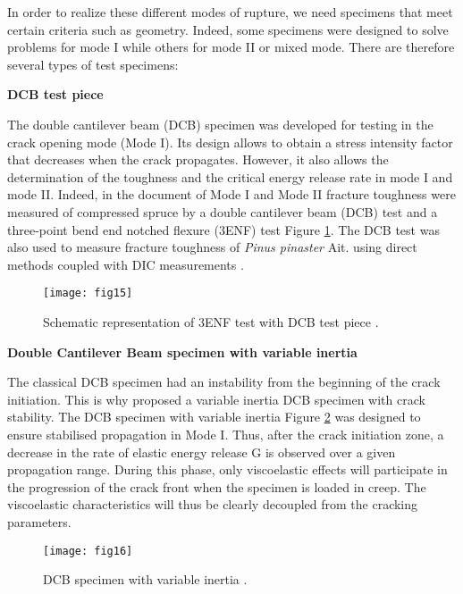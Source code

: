 In order to realize these different modes of rupture, we need specimens that meet certain criteria such as geometry. Indeed, some specimens were designed to solve problems for mode I while others for mode II or mixed mode. There are therefore several types of test specimens:

\textbf{DCB test piece}

The double cantilever beam (DCB) specimen was developed for testing in the crack opening mode (Mode I). Its design allows to obtain a stress intensity factor that decreases when the crack propagates. However, it also allows the determination of the toughness and the critical energy release rate in mode I and mode II. Indeed, in the document of \citep{YoshiharaandNobusue2008} Mode I and Mode II fracture toughness were measured of compressed spruce by a double cantilever beam (DCB) test and a three-point bend end notched flexure (3ENF) test Figure \ref{fig:fig15}. The DCB test was also used to measure fracture toughness of \textit{Pinus pinaster} Ait. using direct methods coupled with DIC measurements \citep{Xavieretal2014, Xavier20147371}.


\begin{figure}[htp]
	\centering
	\texttt{[image: fig15]}
	\caption{Schematic representation of 3ENF test with DCB test piece \citep{DavidsonandSun2005}.}
	\label{fig:fig15}
\end{figure}

\newpage
\textbf{Double Cantilever Beam specimen with variable inertia}

The classical DCB specimen had an instability from the beginning of the crack initiation. This is why \citep{Dubois2002} proposed a variable inertia DCB specimen with crack stability. The DCB specimen with variable inertia Figure \ref{fig:fig16} was designed to ensure stabilised propagation in Mode I. Thus, after the crack initiation zone, a decrease in the rate of elastic energy release G is observed over a given propagation range. During this phase, only viscoelastic effects will participate in the progression of the crack front when the specimen is loaded in creep. The viscoelastic characteristics will thus be clearly decoupled from the cracking parameters.


\begin{figure}[htp]
	\centering
	\texttt{[image: fig16]}
	\caption{DCB specimen with variable inertia \citep{Dubois2002}.}
	\label{fig:fig16}
\end{figure}


